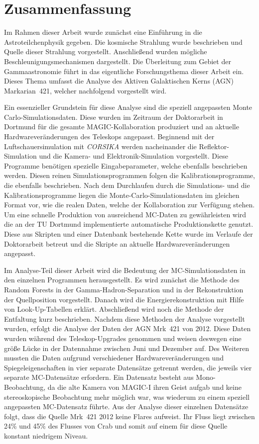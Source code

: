 \chapter{Zusammenfassung}
Im Rahmen dieser Arbeit wurde zunächst eine Einführung in die Astroteilchenphysik gegeben. 
Die kosmische Strahlung wurde beschrieben und Quelle dieser Strahlung vorgestellt.
Anschließend wurden mögliche Beschleunigungsmechanismen dargestellt.
Die Überleitung zum Gebiet der Gammaastronomie führt in das eigentliche Forschungsthema dieser Arbeit ein.
Dieses Thema umfasst die Analyse des Aktiven Galaktischen Kerns (AGN) Markarian~421, welcher nachfolgend vorgestellt wird.

Ein essenzieller Grundstein für diese Analyse sind die speziell angepassten Monte Carlo-Simulationsdaten.
Diese wurden im Zeitraum der Doktorarbeit in Dortmund für die gesamte MAGIC-Kollaboration produziert und an aktuelle Hardwareveränderungen des Teleskops angepasst.
Beginnend mit der Luftschauersimulation mit \textit{CORSIKA} werden nacheinander die Reflektor-Simulation und die Kamera- und Elektronik-Simulation vorgestellt.
Diese Programme benötigen spezielle Eingabeparameter, welche ebenfalls beschrieben werden.
Diesen reinen Simulationsprogrammen folgen die Kalibrationsprogramme, die ebenfalls beschrieben. 
Nach dem Durchlaufen durch die Simulations- und die Kalibrationsprogramme liegen die Monte-Carlo-Simulationsdaten im gleichen Format vor, wie die realen Daten, welche der Kollaboration zur Verfügung stehen.
Um eine schnelle Produktion von ausreichend MC-Daten zu gewährleisten wird die an der TU Dortmund implementierte automatische Produktionskette genutzt.
Diese aus Skripten und einer Datenbank bestehende Kette wurde im Verlaufe der Doktorarbeit betreut und die Skripte an aktuelle Hardwareveränderungen angepasst.

Im Analyse-Teil dieser Arbeit wird die Bedeutung der MC-Simulationsdaten in den einzelnen Programmen herausgestellt.
Es wird zunächst die Methode des Random Forests in der Gamma-Hadron-Separation und in der Rekonstruktion der Quellposition vorgestellt.
Danach wird die Energierekonstruktion mit Hilfe von Look-Up-Tabellen erklärt.
Abschließend wird noch die Methode der Entfaltung kurz beschrieben.
Nachdem diese Methoden der Analyse vorgestellt wurden, erfolgt die Analyse der Daten der AGN Mrk~421 von 2012.
Diese Daten wurden während des Teleskop-Upgrades genommen und weisen deswegen eine größe Lücke in der Datennahme zwischen Juni und Dezember auf. 
Des Weiteren mussten die Daten aufgrund verschiedener Hardwareveränderungen und Spiegeleigenschaften in vier separate Datensätze getrennt werden, die jeweils vier separate MC-Datensätze erfordern.
Ein Datensatz besteht aus Mono-Beobachtung, da die alte Kamera von MAGIC-I ihren Geist aufgab und keine stereoskopische Beobachtung mehr möglich war, was wiederum zu einem speziell angepassten MC-Datensatz führte.
Aus der Analyse dieser einzelnen Datensätze folgt, dass die Quelle Mrk~421 2012 keine Flares aufweist.
Ihr Fluss liegt zwischen 24\% und 45\% des Flusses von Crab und somit auf einem für diese Quelle konstant niedrigem Niveau.

